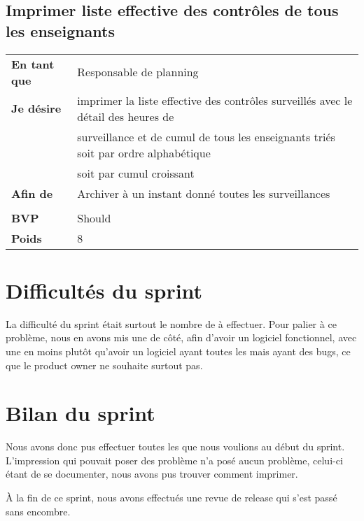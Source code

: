 \subsection{Imprimer liste effective des contrôles de tous les enseignants}
\begin{tabular}{ll}
	\textbf{En tant que}	&	Responsable de planning\\
	\textbf{Je désire}&	imprimer la liste effective des contrôles surveillés avec le détail des heures de\\
	& surveillance et de cumul de tous les enseignants triés soit par ordre alphabétique\\
	& soit par cumul croissant\\
	\textbf{Afin de}	& Archiver à un instant donné toutes les surveillances\\
	&\\
	\textbf{BVP} & Should\\
	\textbf{Poids} & 8\\
\end{tabular}



\section{Difficultés du sprint}
La difficulté du sprint était surtout le nombre de \USs{} à effectuer. Pour palier à ce problème, nous en 
avons mis une de côté, afin d'avoir un logiciel fonctionnel, avec une \US{} en moins plutôt qu'avoir
un logiciel ayant toutes les \USs{} mais ayant des bugs, ce que le product owner ne souhaite surtout pas.

\section{Bilan du sprint}
Nous avons donc pus effectuer toutes les \US{} que nous voulions au début du sprint. L'impression qui
pouvait poser des problème n'a posé aucun problème, celui-ci étant de se documenter, nous avons pus
trouver comment imprimer. 

À la fin de ce sprint, nous avons effectués une revue de release qui s'est passé sans encombre.

